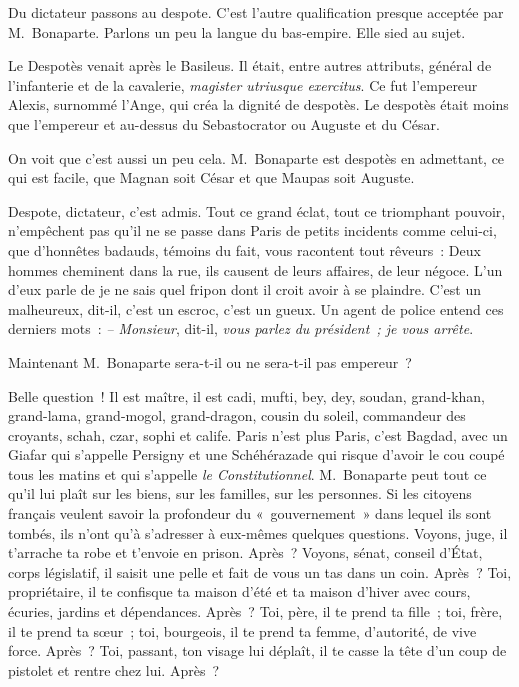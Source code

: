 \documentclass[french,twoside]{book} %
\begin{document}
Du dictateur passons au despote. C’est l’autre qualification presque acceptée par M. Bonaparte. Parlons un peu la langue du bas-empire. Elle sied au sujet.\par
Le Despotès venait après le Basileus. Il était, entre autres attributs, général de l’infanterie et de la cavalerie, \emph{magister utriusque exercitus}. Ce fut l’empereur Alexis, surnommé l’Ange, qui créa la dignité de despotès. Le despotès était moins que l’empereur et au-dessus du Sebastocrator ou Auguste et du César.\par
On voit que c’est aussi un peu cela. M. Bonaparte est despotès en admettant, ce qui est facile, que Magnan soit César et que Maupas soit Auguste.\par
Despote, dictateur, c’est admis. Tout ce grand éclat, tout ce triomphant pouvoir, n’empêchent pas qu’il ne se passe dans Paris de petits incidents comme celui-ci, que d’honnêtes badauds, témoins du fait, vous racontent tout rêveurs : Deux hommes cheminent dans la rue, ils causent de leurs affaires, de leur négoce. L’un d’eux parle de je ne sais quel fripon dont il croit avoir à se plaindre. C’est un malheureux, dit-il, c’est un escroc, c’est un gueux. Un agent de police entend ces derniers mots : \emph{– Monsieur}, dit-il, \emph{vous parlez du président ; je vous arrête}.\par
Maintenant M. Bonaparte sera-t-il ou ne sera-t-il pas empereur ?\par
Belle question ! Il est maître, il est cadi, mufti, bey, dey, soudan, grand-khan, grand-lama, grand-mogol, grand-dragon, cousin du soleil, commandeur des croyants, schah, czar, sophi et calife. Paris n’est plus Paris, c’est Bagdad, avec un Giafar qui s’appelle Persigny et une Schéhérazade qui risque d’avoir le cou coupé tous les matins et qui s’appelle \emph{le Constitutionnel}. M. Bonaparte peut tout ce qu’il lui plaît sur les biens, sur les familles, sur les personnes. Si les citoyens français veulent savoir la profondeur du « gouvernement » dans lequel ils sont tombés, ils n’ont qu’à s’adresser à eux-mêmes quelques questions. Voyons, juge, il t’arrache ta robe et t’envoie en prison. Après ? Voyons, sénat, conseil d’État, corps législatif, il saisit une pelle et fait de vous un tas dans un coin. Après ? Toi, propriétaire, il te confisque ta maison d’été et ta maison d’hiver avec cours, écuries, jardins et dépendances. Après ? Toi, père, il te prend ta fille ; toi, frère, il te prend ta sœur ; toi, bourgeois, il te prend ta femme, d’autorité, de vive force. Après ? Toi, passant, ton visage lui déplaît, il te casse la tête d’un coup de pistolet et rentre chez lui. Après ?\par
\end{document}

